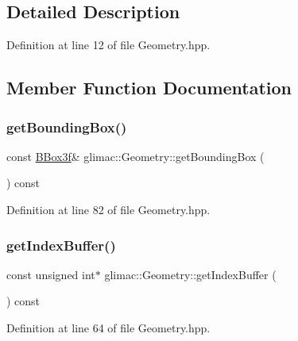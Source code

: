 \subsection{Detailed Description}


Definition at line 12 of file Geometry.\+hpp.



\subsection{Member Function Documentation}
\mbox{\label{classglimac_1_1_geometry_aa91aac0c120e51e59e192a518e790311}} 
\subsubsection{\texorpdfstring{get\+Bounding\+Box()}{getBoundingBox()}}
{\footnotesize\ttfamily const \hyperlink{structglimac_1_1_b_box3f}{B\+Box3f}\& glimac\+::\+Geometry\+::get\+Bounding\+Box (\begin{DoxyParamCaption}{ }\end{DoxyParamCaption}) const\hspace{0.3cm}{\ttfamily [inline]}}



Definition at line 82 of file Geometry.\+hpp.

\mbox{\label{classglimac_1_1_geometry_a26b9a7ccfd6a574284fb054821ed6bbd}} 
\subsubsection{\texorpdfstring{get\+Index\+Buffer()}{getIndexBuffer()}}
{\footnotesize\ttfamily const unsigned int$\ast$ glimac\+::\+Geometry\+::get\+Index\+Buffer (\begin{DoxyParamCaption}{ }\end{DoxyParamCaption}) const\hspace{0.3cm}{\ttfamily [inline]}}



Definition at line 64 of file Geometry.\+hpp.

